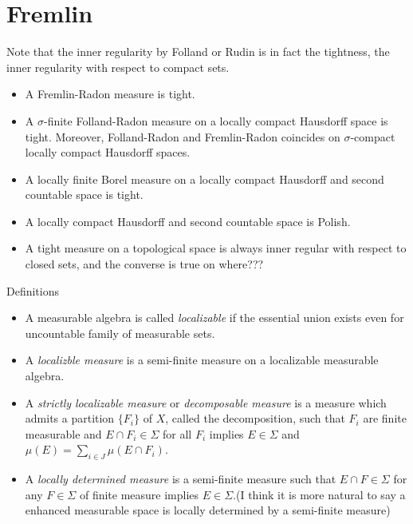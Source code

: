 \documentclass{../../large}
\begin{document}
\section*{Fremlin}


Note that the inner regularity by Folland or Rudin is in fact the tightness, the inner regularity with respect to compact sets.

\begin{itemize}
\item A Fremlin-Radon measure is tight.
\item A $\sigma$-finite Folland-Radon measure on a locally compact Hausdorff space is tight. Moreover, Folland-Radon and Fremlin-Radon coincides on $\sigma$-compact locally compact Hausdorff spaces.
\item A locally finite Borel measure on a locally compact Hausdorff and second countable space is tight.
\item A locally compact Hausdorff and second countable space is Polish.
\item A tight measure on a topological space is always inner regular with respect to closed sets, and the converse is true on where???
\end{itemize}

Definitions
\begin{itemize}
\item A measurable algebra is called \emph{localizable} if the essential union exists even for uncountable family of measurable sets.
\item A \emph{localizble measure} is a semi-finite measure on a localizable measurable algebra.
\item A \emph{strictly localizable measure} or \emph{decomposable measure} is a measure which admits a partition $\{F_i\}$ of $X$, called the decomposition, such that $F_i$ are finite measurable and $E\cap F_i\in\Sigma$ for all $F_i$ implies $E\in\Sigma$ and $\mu(E)=\sum_{i\in J}\mu(E\cap F_i)$.
\item A \emph{locally determined measure} is a semi-finite measure such that $E\cap F\in\Sigma$ for any $F\in\Sigma$ of finite measure implies $E\in\Sigma$.(I think it is more natural to say a enhanced measurable space is locally determined by a semi-finite measure)
\end{itemize}
\end{document}
